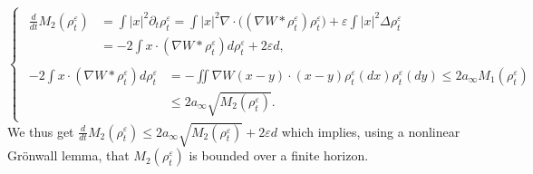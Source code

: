 \documentclass[JEP,XML,SOM,Unicode, NoFloatCountersInSection,published]{cedram}
\def\eps{\varepsilon}
\def\pa{\partial}
\theoremstyle{plain}
\theoremstyle{definition}
\begin{document}
\[
\begin{cases}
\begin{aligned}
\frac{d}{dt} M_2(\rho_t^\eps) &= \int |x|^2 \pa_t \rho_t^\eps = \int |x|^2 \nabla \cdot \big( (\nabla W * \rho_t^\eps) \rho_t^\eps \big) + \eps \int |x|^2 \Delta \rho_t^\eps \\
&= - 2 \int x \cdot (\nabla W * \rho_t^\eps) d\rho_t^\eps + 2\eps d,
\end{aligned}
\\
\begin{aligned}
- 2 \int x \cdot (\nabla W * \rho_t^\eps) d\rho_t^\eps &= - \iint \nabla W(x-y) \cdot (x-y) \rho_t^\eps(dx) \rho_t^\eps(dy) \leq 2 a_\infty M_1(\rho_t^\eps) \\
&\leq 2 a_\infty \sqrt{M_2(\rho_t^\eps)}.
\end{aligned}
\end{cases}
\]
We thus get $\frac{d}{dt} M_2(\rho_t^\eps) \leq 2 a_\infty \sqrt{M_2(\rho_t^\eps)} + 2\eps d$ which implies, using a nonlinear Grönwall lemma, that $M_2(\rho_t^\eps)$ is bounded over a finite horizon.
\end{document}
